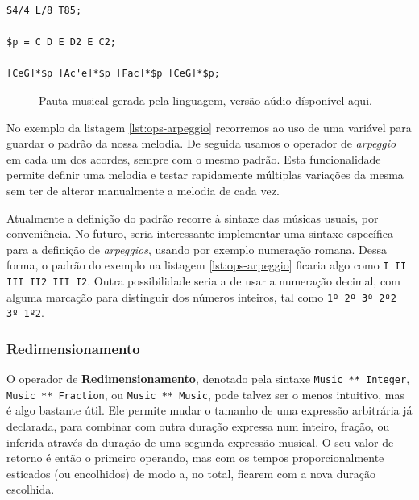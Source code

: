 \begin{lstlisting}[caption={Três acordes diferentes arpegiados com o mesmo padrão},label=lst:ops-arpeggio,belowcaptionskip=-\medskipamount]
S4/4 L/8 T85;

$p = C D E D2 E C2;

[CeG]*$p [Ac'e]*$p [Fac]*$p [CeG]*$p;
\end{lstlisting}

\begin{figure}[ht]
  \centering
  {%
  \setlength{\fboxsep}{0pt}%
  \setlength{\fboxrule}{0pt}%
  }%
  \caption{Pauta musical gerada pela linguagem, versão aúdio dísponível \href{https://drive.google.com/file/d/1E6ayR6gG2CfsikWFHijnEIui0rR1cAL7}{\underline{aqui}}\protect\footnotemark.}
  \label{fig:ops-arpeggio}
\end{figure}

No exemplo da listagem \ref{lst:ops-arpeggio} recorremos ao uso de uma variável para guardar o padrão da nossa melodia. De seguida usamos o operador de \textit{arpeggio} em cada um dos acordes, sempre com o mesmo padrão. Esta funcionalidade permite definir uma melodia e testar rapidamente múltiplas variações da mesma sem ter de alterar manualmente a melodia de cada vez.

Atualmente a definição do padrão recorre à sintaxe das músicas usuais, por conveniência. No futuro, seria interessante implementar uma sintaxe específica para a definição de \textit{arpeggios}, usando por exemplo numeração romana. Dessa forma, o padrão do exemplo na listagem \ref{lst:ops-arpeggio} ficaria algo como \verb|I II III II2 III I2|. Outra possibilidade seria a de usar a numeração decimal, com alguma marcação para distinguir dos números inteiros, tal como \verb|1º 2º 3º 2º2 3º 1º2|.


\subsubsection{Redimensionamento}
O operador de \textbf{Redimensionamento}, denotado pela sintaxe \verb|Music ** Integer|, \verb|Music ** Fraction|, ou \verb|Music ** Music|, pode talvez ser o menos intuitivo, mas é algo bastante útil. Ele permite mudar o tamanho de uma expressão arbitrária já declarada, para combinar com outra duração expressa num inteiro, fração, ou inferida através da duração de uma segunda expressão musical. O seu valor de retorno é então o primeiro operando, mas com os tempos proporcionalmente esticados (ou encolhidos) de modo a, no total, ficarem com a nova duração escolhida.

